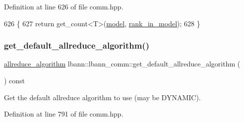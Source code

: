 Definition at line 626 of file comm.\+hpp.


\begin{DoxyCode}
626                            \{
627     \textcolor{keywordflow}{return} get\_count<T>(\hyperlink{namespacelbann_adee41f31f15f3906cbdcce4a1417eb56a20f35e630daf44dbfa4c3f68f5399d8c}{model}, \hyperlink{classlbann_1_1lbann__comm_a0dcccd57c2b591eb7682e192e0a09033}{rank\_in\_model});
628   \}
\end{DoxyCode}
\mbox{\label{classlbann_1_1lbann__comm_aafcb505629dd550ebd0b2c41792aca27}} 
\subsubsection{\texorpdfstring{get\+\_\+default\+\_\+allreduce\+\_\+algorithm()}{get\_default\_allreduce\_algorithm()}}
{\footnotesize\ttfamily \hyperlink{classlbann_1_1lbann__comm_a02a03227cc27e3516f0d9f9812f32019}{allreduce\+\_\+algorithm} lbann\+::lbann\+\_\+comm\+::get\+\_\+default\+\_\+allreduce\+\_\+algorithm (\begin{DoxyParamCaption}{ }\end{DoxyParamCaption}) const\hspace{0.3cm}{\ttfamily [inline]}}

Get the default allreduce algorithm to use (may be D\+Y\+N\+A\+M\+IC). 

Definition at line 791 of file comm.\+hpp.



